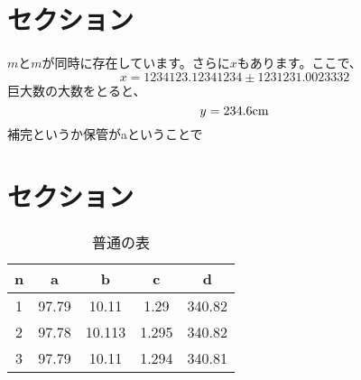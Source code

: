\section{セクション}
\(m\)と$m$が同時に存在しています。さらに$x$もあります。ここで、
\begin{equation}
    x = 1234123.12341234 \pm 1231231.0023332
\end{equation}
巨大数の大数をとると、
\begin{equation}
    y = 234.6  \rm{cm}
\end{equation}
補完というか保管がaということで{}

\section{セクション}
\begin{table}[H]
    \caption{普通の表}
    \label{tab:m}
    \centering
    \begin{tabular}{ccccc}
        \hline \hline
        n & a     & b      & c     & d      \\
        \hline
        1 & 97.79 & 10.11  & 1.29  & 340.82 \\
        2 & 97.78 & 10.113 & 1.295 & 340.82 \\
        3 & 97.79 & 10.11  & 1.294 & 340.81 \\
        \hline \hline
    \end{tabular}
\end{table}